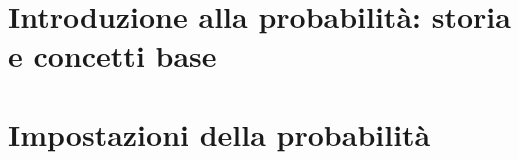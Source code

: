 \documentclass{article}
\begin{document}
\newgeometry{}

\tableofcontents
\restoregeometry

\section{Introduzione alla probabilità: storia e concetti base}


\section{Impostazioni della probabilità}

\end{document}
